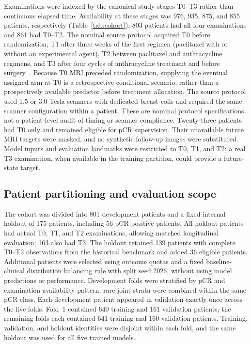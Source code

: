 Examinations were indexed by the canonical study stages T0--T3 rather than
continuous elapsed time. Availability at these stages was 976, 935, 875, and
855 patients, respectively (Table~\ref{tab:cohort}); 803 patients had all four
examinations and 861 had T0--T2. The nominal source protocol acquired T0 before
randomization, T1 after three weeks of the first regimen (paclitaxel with or
without an experimental agent), T2 between paclitaxel and anthracycline
regimens, and T3 after four cycles of anthracycline treatment and before
surgery~\citep{tciaispy2_2022}. Because T0 MRI preceded randomization, supplying
the eventual assigned arm at T0 is a retrospective conditional scenario,
rather than a prospectively available predictor before treatment allocation.
The source protocol used 1.5 or 3.0 Tesla scanners with dedicated breast coils
and required the same scanner configuration within a patient. These are
nominal protocol specifications, not a patient-level audit of timing or
scanner compliance. Twenty-three patients had T0 only and remained
eligible for pCR supervision. Their unavailable future MRI targets were
masked, and no synthetic follow-up images were substituted. Model inputs and
evaluation landmarks were restricted to T0, T1, and T2; a real T3 examination,
when available in the training partition, could provide a future-state target.

\subsection{Patient partitioning and evaluation scope}
The cohort was divided into 801 development patients and a fixed internal
holdout of 175 patients, including 56 pCR-positive patients. All holdout
patients had actual T0, T1, and T2 examinations, allowing matched longitudinal
evaluation; 163 also had T3. The holdout retained 139 patients with complete
T0--T2 observations from the historical benchmark and added 36 eligible
patients. Additional patients were selected using outcome quotas and a fixed
baseline-clinical distribution balancing rule with split seed 2026, without
using model predictions or performance. Development folds were stratified by
pCR and examination-availability pattern; rare joint strata were combined
within the same pCR class. Each development patient appeared in validation
exactly once across the five folds. Fold~1 contained 640 training and 161
validation patients; the remaining folds each contained 641 training and 160
validation patients. Training, validation, and holdout identities were
disjoint within each fold, and the same holdout was used for all five trained
models.

